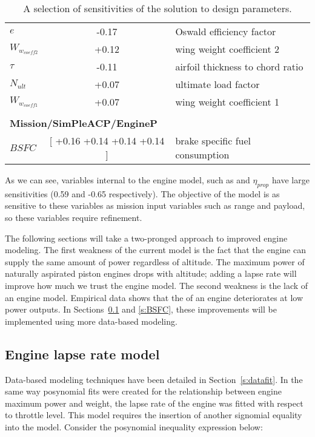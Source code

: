 \begin{table}
\begin{tabular}{l c l}
            $e$ & -0.17 & Oswald efficiency factor \\
            $W_{w_{coeff2}}$ & +0.12 & wing weight coefficient 2 \\
            $\tau$ & -0.11 & airfoil thickness to chord ratio \\
            $N_{ult}$ & +0.07 & ultimate load factor \\
            $W_{w_{coeff1}}$ & +0.07 & wing weight coefficient 1 \\
            & & \\
            \multicolumn{3}{l}{\textbf{Mission/SimPleACP/EngineP}} \\
            $BSFC$ & [ +0.16 +0.14 +0.14 +0.14    ] & brake specific fuel consumption \\
            \bottomrule
        \end{tabular}
        \caption{A selection of sensitivities of the solution to design parameters.}
        \label{t:sens}
    \end{table}

As we can see, variables internal to the engine model, such as \BSFC and $\eta_{prop}$ have
large sensitivities (0.59 and -0.65 respectively). The objective of the model
is as sensitive to these variables as mission input variables such as range and payload, so
these variables require refinement.

The following sections will take a two-pronged approach to improved engine modeling.
The first weakness of the current model is the fact that the engine can supply the same amount of power
regardless of altitude. The maximum power of naturally aspirated piston engines drops
with altitude; adding a lapse rate will improve how much we trust the engine model.
The second weakness is the lack of an engine \BSFC model. Empirical data shows that the
\BSFC of an engine deteriorates at low power outputs.
In Sections~\ref{s:lapse} and \ref{s:BSFC}, these improvements will be implemented using more data-based modeling.

\subsection{Engine lapse rate model}
\label{s:lapse}

Data-based modeling techniques have been detailed in Section~\ref{s:datafit}.
In the same way posynomial fits were created for the relationship between
engine maximum power and weight, the lapse rate of the engine was fitted with respect to throttle level.
This model requires the insertion of another signomial equality into the model. Consider the
posynomial inequality expression below:

